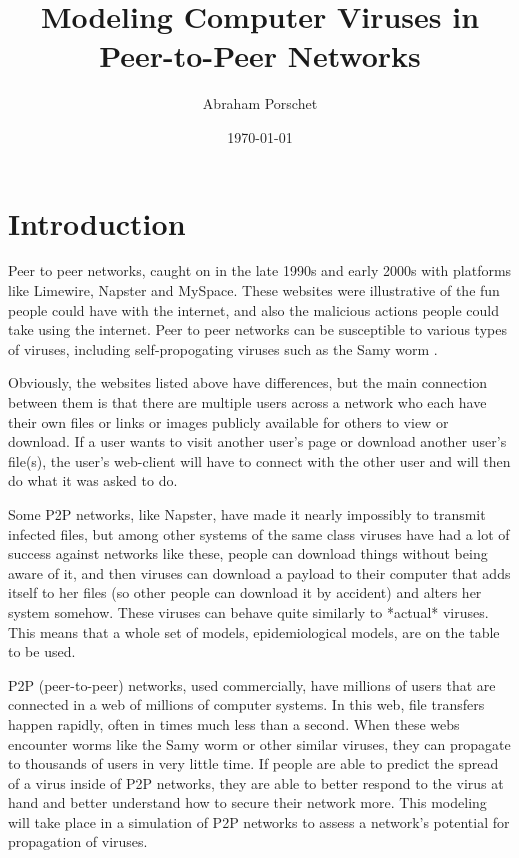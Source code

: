 \documentclass[12pt, oneside]{article}
\title{Modeling Computer Viruses in Peer-to-Peer Networks}
\author{Abraham Porschet}
\date{\today}
\begin{document}
    \maketitle

    \section{Introduction}
        Peer to peer networks, caught on in the late 1990s and early 2000s with platforms like Limewire, Napster and MySpace. These websites
        were illustrative of the fun people could have with the internet, and also the malicious actions people could take using the internet.
        Peer to peer networks can be susceptible to various types of viruses, including self-propogating viruses such as the Samy worm \cite{VICE_2015}.\newline
        
        Obviously, the websites listed above have differences, but the main connection between them is that there are multiple users across a network
        who each have their own files or links or images publicly available for others to view or download. If a user wants to visit another user's 
        page or download another user's file(s), the user's web-client will have to connect with the other user and will then do what it was asked to do.\newline

        Some P2P networks, like Napster, have made it nearly impossibly to transmit infected files, but among other systems of the same class viruses have had a lot of success against networks like these, people can download things without being aware of it, and then viruses can download a payload to their 
        computer that adds itself to her files (so other people can download it by accident) and alters her system somehow. These viruses can behave quite similarly to 
        *actual* viruses. This means that a whole set of models, epidemiological models, are on the table to be used.\newline
        
        P2P (peer-to-peer) networks, used commercially, have millions of users that are connected in a web of millions of computer systems.
        In this web, file transfers happen rapidly, often in times much less than a second. When these webs encounter worms like the Samy worm
        or other similar viruses, they can propagate to thousands of users in very little time. If people are able to predict the spread of
        a virus inside of P2P networks, they are able to better respond to the virus at hand and better understand how to secure their network more.
        This modeling will take place in a simulation of P2P networks to assess a network's potential for propagation of viruses.\newline
\end{document}
